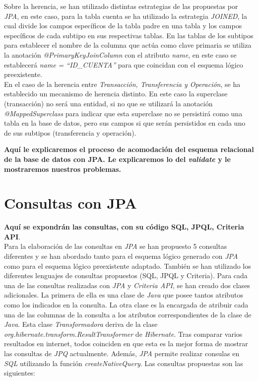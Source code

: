 \documentclass[11pt,a4paper]{article}
\begin{document}
Sobre la herencia, se han utilizado distintas estrategias de las propuestas por \emph{JPA}, en este caso, para la tabla cuenta se ha utilizado la estrategia \emph{JOINED}, la cual divide los campos específicos de la tabla padre en una tabla y los campos específicos de cada subtipo en sus respectivas tablas. En las tablas de los subtipos para establecer el nombre de la columna que actúa como clave primaria se utiliza la anotación \emph{@PrimaryKeyJoinColumn} con el atributo \emph{name}, en este caso se establecerá \emph{name = ``ID\_{}CUENTA''} para que coincidan con el esquema lógico preexistente.\\
En el caso de la herencia entre \emph{Transacción, Transferencia y Operación}, se ha establecido un mecanismo de herencia distinto. En este caso la superclase (transacción) no será una entidad, si no que se utilizará la anotación \emph{@MappedSuperclass} para indicar que esta superclase no se persistirá como una tabla en la base de datos, pero sus campos si que serán persistidos en cada uno de sus subtipos (transferencia y operación).

\textbf{Aquí le explicaremos el proceso de acomodación del esquema relacional de la base de datos con JPA. Le explicaremos lo del \emph{validate} y le mostraremos nuestros problemas.}

\section{Consultas con JPA}

\textbf{Aquí se expondrán las consultas, con su código SQL, JPQL, Criteria API}.\\
Para la elaboración de las consultas en \emph{JPA} se han propuesto 5 consultas diferentes y se han abordado tanto para el esquema lógico generado con \emph{JPA} como para el esquema lógico preexistente adaptado. También se han utilizado los diferentes lenguajes de consultas propuestos (SQL, JPQL y Criteria). 
Para cada una de las consultas realizadas con \textit{JPA} y \textit{Criteria API}, se han creado dos clases adicionales. La primera de ella es una clase de \textit{Java} que posee tantos atributos como los indicados en la consulta. La otra clase es la encargada de atribuir cada una de las columnas de la consulta a los atributos correspondientes de la clase de \textit{Java}. Esta clase \textit{Transformadora} deriva de la clase \textit{org.hibernate.transform.ResultTransformer} de \textit{Hibernate}. Tras comparar varios resultados en internet, todos coinciden en que esta es la mejor forma de mostrar las consultas de \textit{JPQ} actualmente.
Además, \textit{JPA} permite realizar consulas en \textit{SQL} utilizando la función \textit{createNativeQuery}.
Las consultas propuestas son las siguientes:
\end{document}
